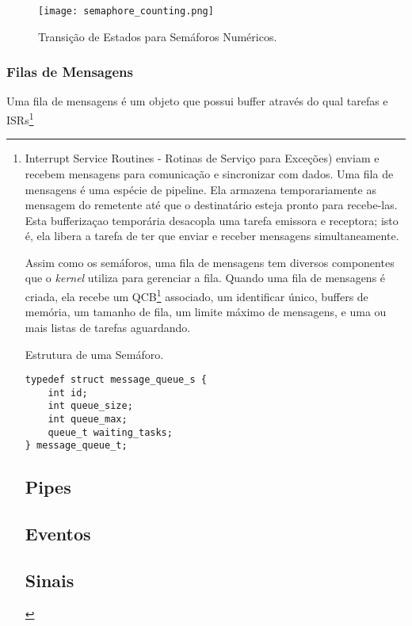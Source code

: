 \begin{figure}[htb]
	\centering
	\texttt{[image: semaphore\_counting.png]}
	\caption{Transição de Estados para Semáforos Numéricos.}
	\label{fig:semaphore_mutex}
\end{figure}

\subsubsection{Filas de Mensagens}

Uma fila de mensagens é um objeto que possui buffer através do qual tarefas e ISRs\footnote{Interrupt Service Routines - Rotinas de Serviço para Exceções) enviam e recebem mensagens para comunicação e sincronizar com dados. Uma fila de mensagens é uma espécie de pipeline. Ela armazena temporariamente as mensagem do remetente até que o destinatário esteja pronto para recebe-las. Esta bufferizaçao temporária desacopla uma tarefa emissora e receptora; isto é, ela libera a tarefa de ter que enviar e receber mensagens simultaneamente.

Assim como os semáforos, uma fila de mensagens tem diversos componentes que o \emph{kernel} utiliza para gerenciar a fila. Quando uma fila de mensagens é criada, ela recebe um QCB\footnote{Queue Control Block - Bloco de Controle de Fila} associado, um identificar único, buffers de memória, um tamanho de fila, um limite máximo de mensagens, e uma ou mais listas de tarefas aguardando.

\begin{listing}
	\label{alg:struct_semaphore}
	\caption{Estrutura de uma Semáforo.}
	\centering
	\begin{verbatim}
typedef struct message_queue_s {
	int id;
	int queue_size;
	int queue_max;
	queue_t waiting_tasks;
} message_queue_t;
	\end{verbatim}
\end{listing}

\subsection{Pipes}

\subsection{Eventos}
\subsection{Sinais}
}
